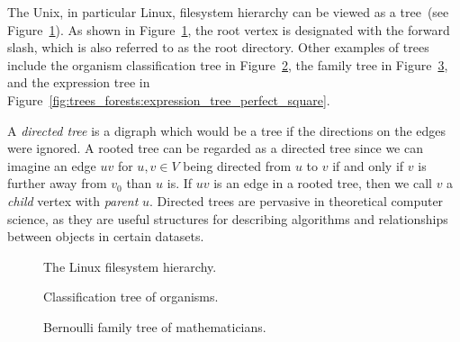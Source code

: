 The Unix, in particular Linux,
filesystem hierarchy
can be viewed as a tree~(see
Figure~\ref{fig:trees_forests:filesystem_hierarchy}). As shown in
Figure~\ref{fig:trees_forests:filesystem_hierarchy}, the
root vertex is designated with the forward slash,
which is also referred to as the root
directory. Other examples of trees include the
organism classification tree in
Figure~\ref{fig:trees_forests:classification_tree_organisms}, the
family tree in
Figure~\ref{fig:trees_forests:Bernoulli_family_tree}, and the
expression tree in
Figure~\ref{fig:trees_forests:expression_tree_perfect_square}.

A \emph{directed tree} is a
digraph which would be a tree if the directions on the
edges were ignored. A rooted tree can be regarded
as a directed tree since we can imagine an edge
$uv$ for $u,v \in V$ being directed from $u$ to $v$ if and only if $v$ is
further away from $v_0$ than $u$ is. If $uv$ is an edge in a
rooted tree, then we call $v$ a
\emph{child} vertex with
\emph{parent} $u$. Directed
trees are pervasive in theoretical computer science, as they are
useful structures for describing algorithms and relationships between
objects in certain datasets.

\begin{figure}[!htbp]
\centering
{}

\caption{The Linux filesystem hierarchy.}
\label{fig:trees_forests:filesystem_hierarchy}
\end{figure}

\begin{figure}[!htbp]
\centering
{}

\caption{Classification tree of organisms.}
\label{fig:trees_forests:classification_tree_organisms}
\end{figure}

\begin{figure}[!htbp]
\centering
{}

\caption{Bernoulli family tree of mathematicians.}
\label{fig:trees_forests:Bernoulli_family_tree}
\end{figure}

